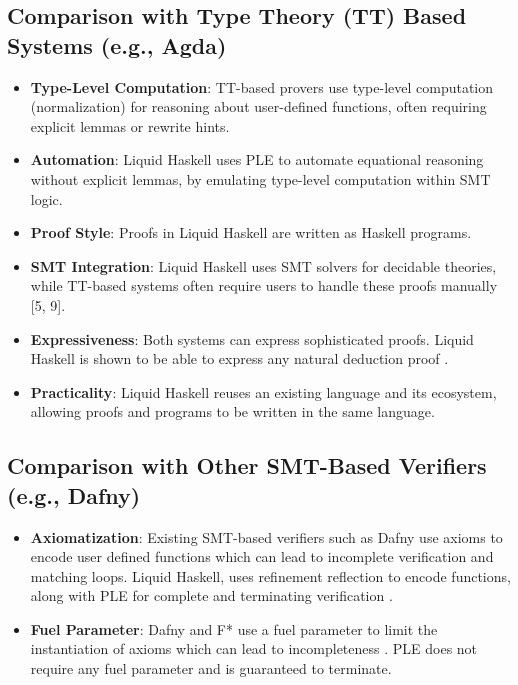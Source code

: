 \documentclass[]{rptuseminar}
\begin{document}
\subsection*{Comparison with Type Theory (TT) Based Systems (e.g., Agda)}

\begin{itemize}
    \item \textbf{Type-Level Computation}: TT-based provers use type-level computation (normalization) 
      for reasoning about user-defined functions, often requiring explicit lemmas or rewrite hints.
    \item \textbf{Automation}: Liquid Haskell uses PLE to automate equational reasoning 
      without explicit lemmas, by emulating type-level computation within SMT logic. 
     \item  \textbf{Proof Style}: Proofs in Liquid Haskell are written as Haskell programs.
    \item  \textbf{SMT Integration}: Liquid Haskell uses SMT solvers for decidable theories, 
        while TT-based systems often require users to handle these proofs manually [5, 9].
    \item \textbf{Expressiveness}: Both systems can express sophisticated proofs. Liquid Haskell is shown 
      to be able to express any natural deduction proof \cite{vazou_refinement_2018}.
   \item \textbf{Practicality}: Liquid Haskell reuses an existing language and its ecosystem, 
     allowing proofs and programs to be written in the same language. 
\end{itemize}

\subsection*{Comparison with Other SMT-Based Verifiers (e.g., Dafny)}
\begin{itemize}
    \item \textbf{Axiomatization}: Existing SMT-based verifiers such as Dafny use axioms to encode user defined functions 
        which can lead to incomplete verification and matching loops. Liquid Haskell, uses refinement 
        reflection to encode functions, along with PLE for complete and terminating verification \cite{vazou_refinement_2018}.
    \item \textbf{Fuel Parameter}: Dafny and F* use a fuel parameter to limit the instantiation of axioms which can lead 
      to incompleteness \cite{vazou_refinement_2018}. PLE does not require any fuel parameter and is guaranteed to terminate.
\end{itemize}
\end{document}
